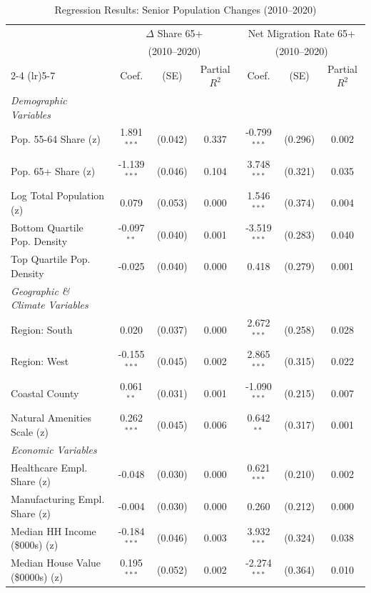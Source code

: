\begin{table}[htbp!]
\centering
\caption{Regression Results: Senior Population Changes (2010--2020)}
\label{tab:combined_regression}
\begin{tabular}{lcccccc}
\hline\hline
 & \multicolumn{3}{c}{$\Delta$ Share 65+} & \multicolumn{3}{c}{Net Migration Rate 65+} \\
 & \multicolumn{3}{c}{(2010--2020)} & \multicolumn{3}{c}{(2010--2020)} \\
\cmidrule(lr){2-4} \cmidrule(lr){5-7}
 & Coef. & (SE) & Partial $R^2$ & Coef. & (SE) & Partial $R^2$ \\
\hline
\textit{Demographic Variables} & & & & & & \\
\quad Pop. 55-64 Share (z) & 1.891$^{***}$ & (0.042) & 0.337 & -0.799$^{***}$ & (0.296) & 0.002 \\
\quad Pop. 65+ Share (z) & -1.139$^{***}$ & (0.046) & 0.104 & 3.748$^{***}$ & (0.321) & 0.035 \\
\quad Log Total Population (z) & 0.079 & (0.053) & 0.000 & 1.546$^{***}$ & (0.374) & 0.004 \\
\quad Bottom Quartile Pop. Density & -0.097$^{**}$ & (0.040) & 0.001 & -3.519$^{***}$ & (0.283) & 0.040 \\
\quad Top Quartile Pop. Density & -0.025 & (0.040) & 0.000 & 0.418 & (0.279) & 0.001 \\
[3pt]
\textit{Geographic \& Climate Variables} & & & & & & \\
\quad Region: South & 0.020 & (0.037) & 0.000 & 2.672$^{***}$ & (0.258) & 0.028 \\
\quad Region: West & -0.155$^{***}$ & (0.045) & 0.002 & 2.865$^{***}$ & (0.315) & 0.022 \\
\quad Coastal County & 0.061$^{**}$ & (0.031) & 0.001 & -1.090$^{***}$ & (0.215) & 0.007 \\
\quad Natural Amenities Scale (z) & 0.262$^{***}$ & (0.045) & 0.006 & 0.642$^{**}$ & (0.317) & 0.001 \\
[3pt]
\textit{Economic Variables} & & & & & & \\
\quad Healthcare Empl. Share (z) & -0.048 & (0.030) & 0.000 & 0.621$^{***}$ & (0.210) & 0.002 \\
\quad Manufacturing Empl. Share (z) & -0.004 & (0.030) & 0.000 & 0.260 & (0.212) & 0.000 \\
\quad Median HH Income (\$000s) (z) & -0.184$^{***}$ & (0.046) & 0.003 & 3.932$^{***}$ & (0.324) & 0.038 \\
\quad Median House Value (\$0000s) (z) & 0.195$^{***}$ & (0.052) & 0.002 & -2.274$^{***}$ & (0.364) & 0.010 \\

\end{tabular}
\end{table}
